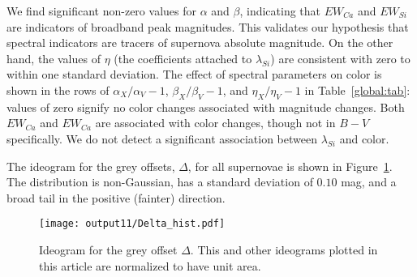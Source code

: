 \documentclass{aastex61}   	%
\begin{document}
We find significant non-zero values for $\alpha$ and $\beta$, indicating that $EW_{Ca}$ and $EW_{Si}$ are indicators of broadband
peak magnitudes.
This validates our hypothesis that spectral indicators
are tracers of supernova absolute magnitude.  On the other hand, the values of $\eta$ (the coefficients attached to $\lambda_{Si}$) are consistent with zero
to  within one standard deviation.
The effect of spectral parameters on color is shown in the rows of $\alpha_X/\alpha_V-1$,  $\beta_X/\beta_V-1$, and  $\eta_X/\eta_V-1$
in Table~\ref{global:tab}:
values of zero signify no color changes associated with magnitude changes.
Both $EW_{Ca}$ and $EW_{Ca}$ are associated with color changes, though not in $B-V$ specifically.
We do not detect a significant association between
$\lambda_{Si}$ and color.


The ideogram for the grey offsets, $\Delta$, for all supernovae is shown in Figure~\ref{hist:fig}.  The distribution is non-Gaussian, 
has a standard deviation of
$0.10$
mag, and a broad tail in the positive (fainter) direction.
\begin{figure}[htbp] %
   \centering
   \texttt{[image: output11/Delta\_hist.pdf]} 
   \caption{Ideogram for the grey offset $\Delta$.  This and other ideograms plotted in this article are normalized to have unit area.
   \label{hist:fig}}
\end{figure}
\end{document}
